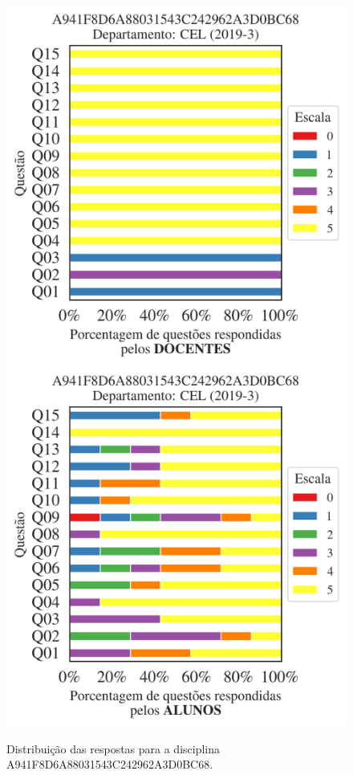 \documentclass[a4paper,10pt]{article}
\begin{document}
\begin{figure}[h]
\centering
\includegraphics[width=0.485\linewidth]{analise_disciplina_departamento_CEL_A941F8D6A88031543C242962A3D0BC68_docentes.png}
\includegraphics[width=0.485\linewidth]{analise_disciplina_departamento_CEL_A941F8D6A88031543C242962A3D0BC68_alunos.png}
\caption{\label{fig:analise_geral_departamento}                Distribuição das respostas para a disciplina A941F8D6A88031543C242962A3D0BC68. }
\end{figure}
\end{document}
